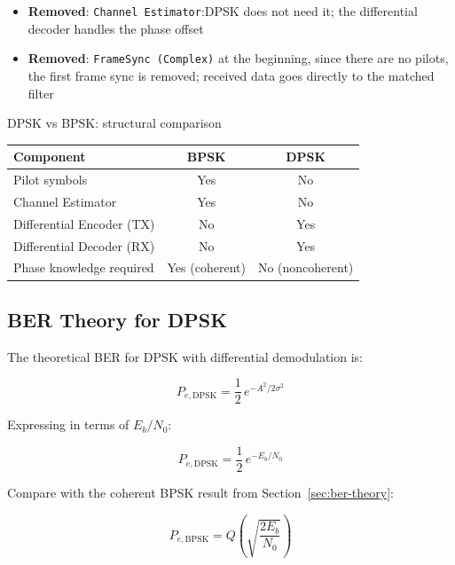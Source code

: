\begin{itemize}
\item \textbf{Removed}: \texttt{Channel Estimator}:DPSK does not need it; the differential decoder handles the phase offset
\item \textbf{Removed}: \texttt{FrameSync (Complex)} at the beginning, since there are no pilots, the first frame sync is removed; received data goes directly to the matched filter
\end{itemize}

\begin{SummaryBox}{DPSK vs BPSK: structural comparison}
\begin{center}
\renewcommand{\arraystretch}{1.3}
\begin{tabular}{lcc}
\hline
\textbf{Component} & \textbf{BPSK} & \textbf{DPSK} \\
\hline
Pilot symbols & Yes & No \\
Channel Estimator & Yes & No \\
Differential Encoder (TX) & No & Yes \\
Differential Decoder (RX) & No & Yes \\
Phase knowledge required & Yes (coherent) & No (noncoherent) \\
\hline
\end{tabular}
\end{center}
\end{SummaryBox}

\subsection{BER Theory for DPSK}

The theoretical BER for DPSK with differential demodulation is:

\begin{equation}
P_{e,\text{DPSK}} = \frac{1}{2}\,e^{-A^2/2\sigma^2}
\end{equation}

Expressing in terms of $E_b/N_0$:

\begin{equation}
\boxed{P_{e,\text{DPSK}} = \frac{1}{2}\,e^{-E_b/N_0}}
\end{equation}

Compare with the coherent BPSK result from Section~\ref{sec:ber-theory}:

\begin{equation}
P_{e,\text{BPSK}} = Q\!\left(\sqrt{\frac{2E_b}{N_0}}\right)
\end{equation}


